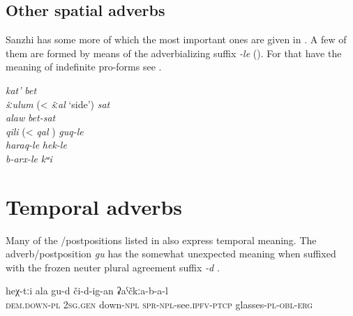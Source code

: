 
\subsection{Other spatial adverbs}
\label{ssec:OtherSpatialAdverbs}

Sanzhi has some more  of which the most important ones are given in . A few of them are formed by means of the adverbializing suffix \textit{-le} (). For  that have the meaning of indefinite pro-forms see .
%
\begin{exe}
	\ex	\label{ex:adjectivesWithKAt}
		\TabPositions{14em}
		\textit{kat'} 					\tab	\textit{bet}	 \\
		\textit{šːulum}  (< \textit{šːal} `side')			\tab	\textit{sat}  \\
		\textit{alaw} 			\tab	\textit{bet-sat}  \\
		\textit{qili}  (< \textit{qal} )  \tab \textit{guq-le}  \\
		\textit{haraq-le} 					\tab	\textit{hek-le}   \\
		\textit{b-arx-le}  			\tab	\textit{kʷi}  \\
\end{exe}



\section{Temporal adverbs}
\label{sec:TemporalAdverbs}

Many of the /postpositions listed in  also express temporal meaning. The adverb/postposition \textit{gu} has the somewhat unexpected meaning  when suffixed with the frozen neuter plural agreement suffix \textit{-d} .
%
\begin{exe}
	\ex	\label{ex:with these glasses of yours with which you were seeing before}
	\gll	heχ-tːi	ala	gu-d	či-d-ig-an	ʡaˁčkːa-b-a-l\\
		\textsc{dem.down}-\textsc{pl}	2\textsc{sg}.\textsc{gen}	down-\textsc{npl}	\textsc{spr}-\textsc{npl}-see.\textsc{ipfv}-\textsc{ptcp}	glasses-\textsc{pl}-\textsc{obl}-\textsc{erg}\\
	\glt	{}
\end{exe}

